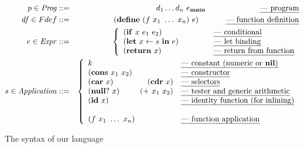\documentclass[9pt]{sigplanconf}
\newcommand{\ID}{\mbox{$\mathbf{ id}$}} %
\begin{document}
\begin{figure*}[]
\footnotesize
\begin{eqnarray*}
   p \in \mathit{Prog} & ::= & d_1 \ldots d_n \,\, e_\mainpgm
    \hspace{7em} \mbox{\em --- program}\\
    \mathit{df} \in Fdef & ::= & (\DEFINE\,\, (f\,\, x_1 \,\, \ldots \,\,x_n)\,\,
    e) 
    \hspace{2.2em} \ \ \ \ \mbox{\em --- function definition} \\
e \in \mathit{Expr} & ::= &
\left\{\begin{array}{ll@{\hspace{4em}}l}
       (\SIF\,\, x\,\, e_1\,\, e_2) && \!\!\!\mbox{\em --- conditional} \\
       (\LET\,\, x \leftarrow s\,\, \IN\,\, e) &&\!\!\! \mbox{\em --- let
binding} \\
       (\SRETURN\,\, x) && \!\!\!\mbox{\em --- return from function}
    \end{array}\right. \\
s \in \mathit{Application} & ::= &
\left\{\begin{array}{lr@{\hspace{1em}}l}
       k && \mbox{\em --- constant (numeric or $\NIL$)}\\
       (\CONS\,\, x_1\,\, x_2) && \mbox{\em --- constructor} \\
       (\CAR\,\, x) &  (\CDR\,\, x) & \mbox{\em --- selectors} \\
       (\NULLQ\,\, x) & (\PRIM\,\, x_1\,\, x_2) & \mbox{\em ---  tester
and generic arithmetic} \\
       (\ID\,\, x) && \mbox{\em ---  identity function (for inlining)}
\\
\\
       \multicolumn{2}{l}{(f\,\, x_1\,\,\ldots\,\, x_n)}
            & \mbox{\em --- function application}
    \end{array}\right.
\end{eqnarray*}
  \caption{The syntax of our language}\label{fig:lang-syntax}
\figrule
\normalsize
\end{figure*}
\end{document}
